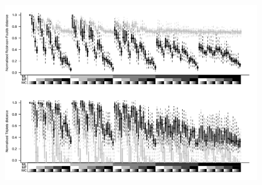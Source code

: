 \documentclass[12pt,letterpaper]{article}
\begin{document}
\newpage
\begin{figure}[!htbp]
\centering
    \includegraphics[width=1\textwidth]{Figures/In_main/ML+Baycon-AllParam-RF+Tr-BW.pdf}
\caption{ }
\end{figure}
\end{document}
